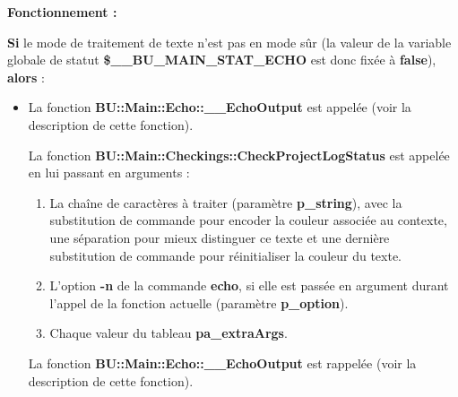 \documentclass[a4paper,10pt]{article}
\begin{document}
\begin{justify}
    \setlength{\parskip}{1em}

    \textbf{Fonctionnement :}

    \textbf{\color{cond}Si} le mode de traitement de texte n'est pas en mode sûr (la valeur de la variable globale de statut \textbf{\color{vars}\$\_\_BU\_MAIN\_STAT\_ECHO} est donc fixée à \textbf{false}), \textbf{\color{cond}alors} :

    \begin{itemize}
        \item
        {
            \begin{justify}
                La fonction \textbf{\color{func}BU::Main::Echo::\_\_EchoOutput} est appelée (voir la description de cette fonction).
            \end{justify}

            \setlength{\parskip}{1em}

            \begin{justify}
                La fonction \textbf{\color{func}BU::Main::Checkings::CheckProjectLogStatus} est appelée en lui passant en arguments :
                \begin{enumerate}
                    \item La chaîne de caractères à traiter (paramètre \textbf{\color{vars}p\_string}), avec la substitution de commande pour encoder la couleur associée au contexte, une séparation pour mieux distinguer ce texte et une dernière substitution de commande pour réinitialiser la couleur du texte.
                    \item L'option \textbf{\color{cmds}-n} de la commande \textbf{\color{cmds}echo}, si elle est passée en argument durant l'appel de la fonction actuelle (paramètre \textbf{\color{vars}p\_option}).
                    \item Chaque valeur du tableau \textbf{\color{vars}pa\_extraArgs}.
                \end{enumerate}
            \end{justify}

            \setlength{\parskip}{1em}

            \begin{justify}
                La fonction \textbf{\color{func}BU::Main::Echo::\_\_EchoOutput} est rappelée (voir la description de cette fonction).
            \end{justify}
        }
    \end{itemize}
\end{justify}
\end{document}
